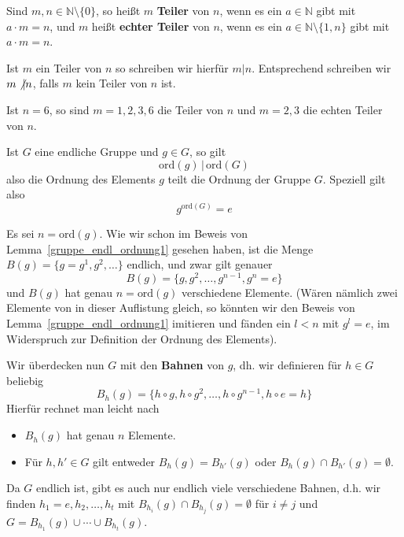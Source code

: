 \begin{definition} Sind $m,n \in \mathbb N \setminus \{0 \}$, so heißt $m$ \textbf{Teiler} 
von $n$, wenn 
es ein $a \in \mathbb N$ gibt mit $a \cdot m = n$, und $m$ heißt \textbf{echter Teiler} von $n$, wenn 
es ein $a \in \mathbb N \setminus \{1, n\}$ gibt mit $a \cdot m = n$.

Ist $m$ ein Teiler von $n$ so schreiben wir hierfür $m \vert n$. Entsprechend schreiben wir $m \not\vert n$, 
falls $m$ kein Teiler von $n$ ist. 
\end{definition}

\begin{beispiel} Ist $n = 6$, so sind $m = 1, 2, 3, 6$ die Teiler von $n$ und $m = 2,3$ die echten Teiler 
von $n$. 
\end{beispiel} 


\begin{lemma}\label{gruppe_endl_ordnung2} Ist $G$ eine endliche Gruppe und $g \in G$, so gilt
  $$ \textrm{ord}(g) \, \vert \, \textrm{ord}(G) $$ 
also die Ordnung des Elements $g$ teilt die Ordnung der Gruppe $G$. Speziell gilt also 
  $$ g^{\textrm{ord}(G)} = e $$
\end{lemma}

Es sei $n = \textrm{ord}(g)$. Wie wir schon im Beweis von Lemma~\ref{gruppe_endl_ordnung1} gesehen haben, 
ist die Menge $B(g) = \{ g = g^1, g^2, \ldots \}$ endlich, und zwar gilt genauer
  $$ B(g) = \{ g, g^2, \ldots , g^{n-1}, g^n = e \} $$
und $B(g)$ hat genau $n  = \textrm{ord}(g)$ verschiedene Elemente. 
(Wären nämlich zwei Elemente von in dieser Auflistung gleich, so könnten 
wir den Beweis von Lemma~\ref{gruppe_endl_ordnung1} imitieren und fänden ein $l < n$ 
mit $g^l = e$, im Widerspruch zur Definition der Ordnung des Elements). 

Wir überdecken nun $G$ mit den \textbf{Bahnen} von $g$, dh. wir definieren für $h \in G$ beliebig
  	$$ B_{h}(g) = \{h \circ g, h \circ g^2 , \ldots , h \circ g^{n-1}, h \circ e = h\} $$
Hierfür rechnet man leicht nach

\begin{itemize}
\item $B_h(g)$ hat genau $n$ Elemente.
\item Für $h, h' \in G$ gilt entweder $B_h(g) = B_{h'}(g)$ oder $B_h(g) \cap B_{h'}(g) = \emptyset$.
\end{itemize}

Da $G$ endlich ist, gibt es auch nur endlich viele verschiedene Bahnen, d.h. wir finden $h_1 = e, h_2, \ldots, 
h_t$ mit $B_{h_i} (g) \cap B_{h_j}(g ) = \emptyset$ für $i \neq j$ und $G = B_{h_1}(g) \cup \cdots \cup 
B_{h_t}(g)$. 

